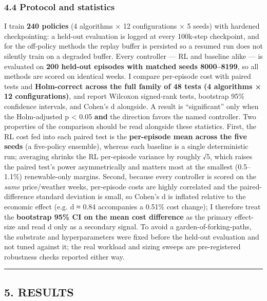 \documentclass[
  11pt,
]{article}
\begin{document}
\subsubsection{4.4 Protocol and
statistics}\label{protocol-and-statistics}

I train \textbf{240 policies} (4 algorithms × 12 configurations × 5
seeds) with hardened checkpointing: a held-out evaluation is logged at
every 100k-step checkpoint, and for the off-policy methods the replay
buffer is persisted so a resumed run does not silently train on a
degraded buffer. Every controller --- RL and baseline alike --- is
evaluated on \textbf{200 held-out episodes with matched seeds
8000--8199}, so all methods are scored on identical weeks. I compare
per-episode cost with paired tests and \textbf{Holm-correct across the
full family of 48 tests (4 algorithms × 12 configurations)}, and report
Wilcoxon signed-rank tests, bootstrap 95\% confidence intervals, and
Cohen's d alongside. A result is ``significant'' only when the
Holm-adjusted p \textless{} 0.05 \textbf{and} the direction favors the
named controller. Two properties of the comparison should be read
alongside these statistics. First, the RL cost fed into each paired test
is the \textbf{per-episode mean across the five seeds} (a five-policy
ensemble), whereas each baseline is a single deterministic run;
averaging shrinks the RL per-episode variance by roughly √5, which
raises the paired test's power asymmetrically and matters most at the
smallest (0.5--1.1\%) renewable-only margins. Second, because every
controller is scored on the \emph{same} price/weather weeks, per-episode
costs are highly correlated and the paired-difference standard deviation
is small, so Cohen's d is inflated relative to the economic effect (e.g.
d ≈ 0.84 accompanies a 0.51\% cost change); I therefore treat the
\textbf{bootstrap 95\% CI on the mean cost difference} as the primary
effect-size and read d only as a secondary signal. To avoid a
garden-of-forking-paths, the substrate and hyperparameters were fixed
before the held-out evaluation and not tuned against it; the real
workload and sizing sweeps are pre-registered robustness checks reported
either way.

\begin{center}\rule{0.5\linewidth}{0.5pt}\end{center}

\subsection{5. RESULTS}\label{results}
\end{document}
